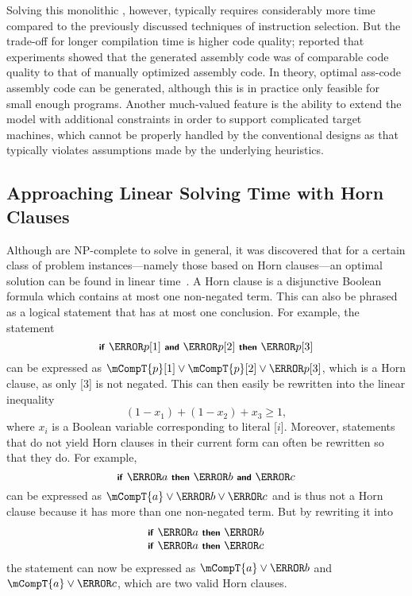 Solving this monolithic \tIPmodel, however, typically requires considerably more
time compared to the previously discussed techniques of \gls{instruction
  selection}.
%
But the trade-off for longer compilation time is higher
code quality; \citeauthor{Wilson1994} reported that experiments showed that the
generated \gls{assembly code} was of comparable code quality to that of
manually optimized \gls{assembly code}.
%
In theory, \gls{optimal ass-code}
\gls{assembly code} can be generated, although this is in practice only feasible
for small enough \glspl{program}.
%
Another much-valued feature is the ability to
extend the model with additional constraints in order to support complicated
\glspl{target machine}, which cannot be properly handled by the conventional
designs as that typically violates assumptions made by the underlying
heuristics.


\subsection{Approaching Linear Solving Time with Horn Clauses}

\newcommand{\mCmd}[1]{\text{\smaller\sffamily\textbf{#1}}}

Although \tIPmodels are NP-complete to solve in general, it was discovered
that for a certain class of problem instances---namely those based on
\glspl{Horn clause}---an optimal solution can be found in linear
time~\cite{Hooker1988}.
%
A \gls{Horn clause} is a disjunctive Boolean formula
which contains at most one non-negated term.
%
This can also be phrased as a
logical statement that has at most one conclusion.
%
For example, the statement
\begin{displaymath}
  \mCmd{if}~\mT{p}[1]~\mCmd{and}~\mT{p}[2]~\mCmd{then}~\mT{p}[3]
\end{displaymath}
\noindent%
can be expressed as \mbox{$\mCompT{p}[1] \mOr \mCompT{p}[2] \mOr \mT{p}[3]$},
which is a \gls{Horn clause}, as only [3] is not negated.
%
This can then
easily be rewritten into the linear inequality
\begin{displaymath}
(1 - x_1) + (1 - x_2) + x_3 \ge 1,
\end{displaymath}
where $x_i$ is a Boolean variable corresponding to literal
[\larger$i$].
%
Moreover, statements that do not yield \glspl{Horn
  clause} in their current form can often be rewritten so that they do.
%
For
example,
\begin{displaymath}
  \mCmd{if}~\mT{a}~\mCmd{then}~\mT{b}~\mCmd{and}~\mT{c}
\end{displaymath}
\noindent%
can be expressed as \mbox{$\mCompT{a} \mOr \mT{b} \mOr \mT{c}$} and is thus not
a \gls{Horn clause} because it has more than one non-negated term.
%
But by
rewriting it into
\begin{displaymath}
  \begin{array}{c}
    \mCmd{if}~\mT{a}~\mCmd{then}~\mT{b}\\
    \mCmd{if}~\mT{a}~\mCmd{then}~\mT{c}
  \end{array}
\end{displaymath}
\noindent%
the statement can now be expressed as \mbox{$\mCompT{a} \mOr \mT{b}$} and
\mbox{$\mCompT{a} \mOr \mT{c}$}, which are two valid \glspl{Horn clause}.

